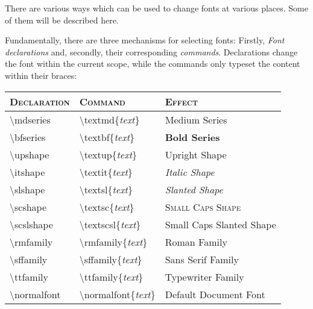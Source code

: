 \documentclass[a4paper,oneside,11pt]{article}
\begin{document}
There  are  various  ways  which  can  be used  to  change  fonts  at  various
places. Some of them will be described here.

Fundamentally,  there  are  three  mechanisms  for  selecting  fonts: Firstly,
\emph{Font     declarations}     and,    secondly,     their     corresponding
\emph{commands}. Declarations change the font  within the current scope, while
the commands only typeset the content within their braces:

\begin{center}
    \begin{tabular}{>{\ttfamily}l<{\normalfont} >{\ttfamily}l<{\normalfont} l}
        \toprule
        \normalfont\scshape Declaration & \normalfont\scshape Command  & \scshape Effect \\
        \midrule
        \textbackslash{}mdseries   & \textbackslash{}textmd\{\textit{text}\}     & \mdseries Medium Series             \\
        \textbackslash{}bfseries   & \textbackslash{}textbf\{\textit{text}\}     & \bfseries Bold Series               \\
        \textbackslash{}upshape    & \textbackslash{}textup\{\textit{text}\}     & \upshape Upright Shape              \\
        \textbackslash{}itshape    & \textbackslash{}textit\{\textit{text}\}     & \itshape Italic Shape               \\
        \textbackslash{}slshape    & \textbackslash{}textsl\{\textit{text}\}     & \slshape Slanted Shape              \\
        \textbackslash{}scshape    & \textbackslash{}textsc\{\textit{text}\}     & \scshape Small Caps Shape           \\
        \textbackslash{}scslshape  & \textbackslash{}textscsl\{\textit{text}\}   & \scslshape Small Caps Slanted Shape \\
        \textbackslash{}rmfamily   & \textbackslash{}rmfamily\{\textit{text}\}   & \rmfamily Roman Family              \\
        \textbackslash{}sffamily   & \textbackslash{}sffamily\{\textit{text}\}   & \sffamily Sans Serif Family         \\
        \textbackslash{}ttfamily   & \textbackslash{}ttfamily\{\textit{text}\}   & \ttfamily Typewriter Family         \\
        \textbackslash{}normalfont & \textbackslash{}normalfont\{\textit{text}\} & \normalfont Default Document Font   \\
        \bottomrule
    \end{tabular}
\end{center}
\end{document}
